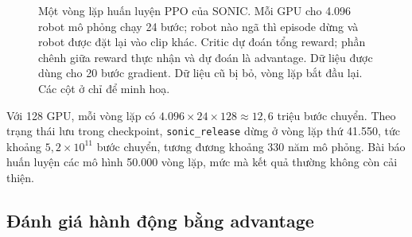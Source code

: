 \documentclass[12pt,a4paper,oneside]{report}
\newcommand{\code}[1]{\texttt{#1}}
\begin{document}
\begin{figure}[htbp]
{}
\caption[Một vòng lặp huấn luyện PPO của SONIC]{Một vòng lặp huấn luyện PPO của SONIC.  Mỗi GPU cho 4.096 robot mô phỏng chạy 24 bước; robot nào ngã thì episode dừng và robot được đặt lại vào clip khác.  Critic dự đoán tổng reward; phần chênh giữa reward thực nhận và dự đoán là advantage.  Dữ liệu được dùng cho 20 bước gradient.  Dữ liệu cũ bị bỏ, vòng lặp bắt đầu lại. Các cột ở  chỉ để minh hoạ.}
\label{fig:ppo_iter}
\end{figure}

Với 128 GPU, mỗi vòng lặp có $4.096 \times 24 \times 128 \approx 12{,}6$ triệu bước chuyển. Theo trạng thái lưu trong checkpoint, \code{sonic\_release} dừng ở vòng lặp thứ 41.550, tức khoảng $5{,}2 \times 10^{11}$ bước chuyển, tương đương khoảng 330 năm mô phỏng. Bài báo huấn luyện các mô hình 50.000 vòng lặp, mức mà kết quả thường không còn cải thiện.

\subsection{Đánh giá hành động bằng advantage}
\label{sec:ppo_adv}
\end{document}
